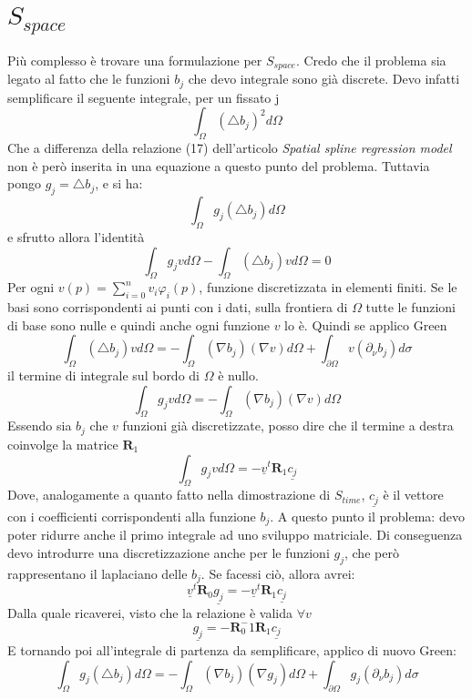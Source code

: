 \documentclass[a4paper,12pt]{report}							%
\begin{document}
\section{$S_{space}$}
Più complesso è trovare una formulazione per $S_{space}$. Credo che il problema sia legato al fatto che le funzioni $b_j$ che devo integrale sono già discrete.
\newline
Devo infatti semplificare il seguente integrale, per un fissato j
$$
\int_\Omega (\bigtriangleup b_j)^2d\Omega
$$
Che a differenza della relazione (17) dell'articolo \textit{Spatial spline regression model} non è però inserita in una equazione a questo punto del problema.
\newline
Tuttavia pongo $g_j=\bigtriangleup b_j$, e si ha:
$$
\int_\Omega g_j(\bigtriangleup b_j)d\Omega
$$
e sfrutto allora l'identità
$$
\int_\Omega g_jvd\Omega - \int_\Omega (\bigtriangleup b_j)vd\Omega=0
$$
Per ogni $v(p)=\sum_{i=0}^nv_i\varphi_i(p)$, funzione discretizzata in elementi finiti. Se le basi sono corrispondenti ai punti con i dati, sulla frontiera di $\Omega$ tutte le funzioni di base sono nulle e quindi anche ogni funzione $v$ lo è. Quindi se applico Green
$$
\int_\Omega (\bigtriangleup b_j)vd\Omega=-\int_\Omega (\nabla b_j)(\nabla v)d\Omega + \int_{\partial \Omega}v(\partial_{\nu}b_j)d\sigma
$$
il termine di integrale sul bordo di $\Omega$ è nullo.
\newline
$$
\int_{\Omega} g_jvd\Omega = -\int_{\Omega} (\nabla b_j)(\nabla v)d\Omega
$$
Essendo sia $b_j$ che $v$ funzioni già discretizzate, posso dire che il termine a destra coinvolge la matrice $\mathbf{R}_1$
$$
\int_{\Omega} g_jvd\Omega = -\underline{v}^t\mathbf{R}_1 \underline{c_j}
$$
Dove, analogamente a quanto fatto nella dimostrazione di $S_{time}$, $\underline{c_j}$ è il vettore con i coefficienti corrispondenti alla funzione $b_j$. 
\newline
A questo punto il problema: devo poter ridurre anche il primo integrale ad uno sviluppo matriciale. Di conseguenza devo introdurre una discretizzazione anche per le funzioni $g_j$, che però rappresentano il laplaciano delle $b_j$. Se facessi ciò, allora avrei:
$$
\underline{v}^t\mathbf{R}_0 \underline{g_j} = -\underline{v}^t\mathbf{R}_1 \underline{c_j}
$$
Dalla quale ricaverei, visto che la relazione è valida $\forall v$
$$
\underline{g_j}=-\mathbf{R}_0^-1\mathbf{R}_1\underline{c_j}
$$
E tornando poi all'integrale di partenza da semplificare, applico di nuovo Green:
$$
\int_\Omega g_j(\bigtriangleup b_j)d\Omega=-\int_{\Omega} (\nabla b_j)(\nabla g_j)d\Omega + \int_{\partial \Omega}g_j(\partial_{\nu}b_j)d\sigma
$$
\end{document}
